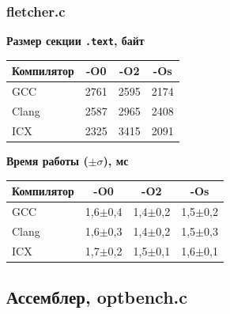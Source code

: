\documentclass[a4paper]{article}
\begin{document}
\subsubsection*{fletcher.c}
\begin{table}[H]
\centering
\footnotesize
\setlength{\tabcolsep}{2pt}
\begin{minipage}{0.48\textwidth}
    \centering
    \textbf{Размер секции \texttt{.text}, байт}\par\vspace{2pt}
    \begin{tabular}{|l|c|c|c|}
    \hline
    Компилятор & -O0 & -O2 & -Os \\
    \hline
    GCC & 2761 & 2595 & 2174 \\
    Clang & 2587 & 2965 & 2408 \\
    ICX & 2325 & 3415 & 2091 \\
    \hline
    \end{tabular}
\end{minipage}\hfill
\begin{minipage}{0.48\textwidth}
    \centering
    \textbf{Время работы (\(\pm \sigma\)), мс}\par\vspace{2pt}
    \begin{tabular}{|l|c|c|c|}
    \hline
    Компилятор & -O0 & -O2 & -Os \\
    \hline
    GCC & 1,6\(\pm\)0,4 & 1,4\(\pm\)0,2 & 1,5\(\pm\)0,2 \\
    Clang & 1,6\(\pm\)0,3 & 1,4\(\pm\)0,2 & 1,5\(\pm\)0,3 \\
    ICX & 1,7\(\pm\)0,2 & 1,5\(\pm\)0,1 & 1,6\(\pm\)0,1 \\
    \hline
    \end{tabular}
\end{minipage}
\end{table}

\subsection{Ассемблер, optbench.c}
\end{document}
